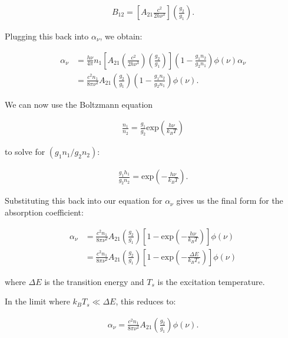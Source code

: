 \documentclass[12pt]{article}
\begin{document}
\begin{align*}
B_{12} = \left[A_{21}\frac{c^2}{2h\nu^3}\right]\left(\frac{g_2}{g_1}\right).
\end{align*}

Plugging this back into $\alpha_\nu$, we obtain:

\begin{equation*}
\begin{split}
\alpha_\nu &= \frac{h\nu}{4\pi}n_1\left[A_{21}\left(\frac{c^2}{2h\nu^3}\right)\left(\frac{g_2}{g_1}\right)\right]\left(1-\frac{g_1n_2}{g_2n_1}\right)\phi(\nu)
\alpha_\nu \\
&= \frac{c^2n_1}{8\pi \nu^2}A_{21}\left(\frac{g_2}{g_1}\right)\left(1-\frac{g_1n_2}{g_2n_1}\right)\phi(\nu).
\end{split}
\end{equation*}

We can now use the Boltzmann equation

\begin{align*}
\frac{n_1}{n_2} = \frac{g_1}{g_2}\mathrm{exp}\left(\frac{h\nu}{k_BT}\right)
\end{align*}

to solve for $(g_1n_1/g_2n_2)$:

\begin{align*}
\frac{g_1h_1}{g_2n_2} = \mathrm{exp}\left(-\frac{h\nu}{k_BT}\right).
\end{align*}

Substituting this back into our equation for $\alpha_\nu$ gives us the final form for the absorption coefficient:

\begin{equation*}
\begin{split}
\alpha_\nu &= \frac{c^2n_1}{8\pi \nu^2}A_{21}\left(\frac{g_2}{g_1}\right)\left[1-\mathrm{exp}\left(-\frac{h\nu}{k_BT}\right)\right]\phi(\nu) \\
 &= \frac{c^2n_1}{8\pi \nu^2}A_{21}\left(\frac{g_2}{g_1}\right)\left[1-\mathrm{exp}\left(-\frac{\Delta E}{k_BT_s}\right)\right]\phi(\nu)
\end{split}
\end{equation*}

where $\Delta E$ is the transition energy and $T_s$ is the excitation temperature.

In the limit where $k_BT_s \ll \Delta E$, this reduces to:

\begin{align*}
\alpha_\nu = \frac{c^2n_1}{8\pi \nu^2}A_{21}\left(\frac{g_2}{g_1}\right)\phi(\nu).
\end{align*}
\end{document}
